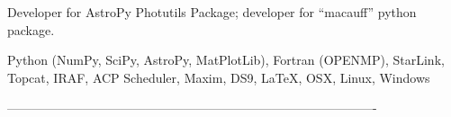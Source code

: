\documentclass[letter, margin, 10pt]{res} %
\begin{document}
\begin{resume}
Developer for AstroPy Photutils Package; developer for ``macauff'' python package.

Python (NumPy, SciPy, AstroPy, MatPlotLib), Fortran (OPENMP), StarLink, Topcat, IRAF, ACP Scheduler, Maxim, DS9, \LaTeX, OSX, Linux, Windows






 
----------------------------------------------------------------------------------------

\end{resume}
\end{document}
